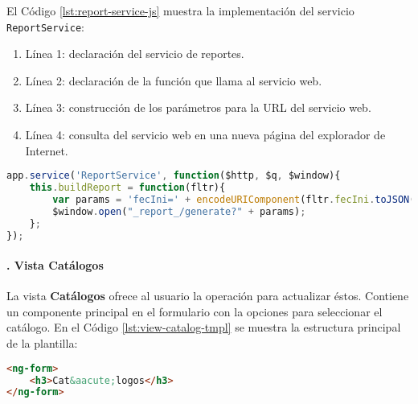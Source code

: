 El Código \ref{lst:report-service-js} muestra la implementación del servicio \texttt{ReportService}:
\begin{enumerate}
	\item Línea 1: declaración del servicio de reportes.
	\item Línea 2: declaración de la función que llama al servicio web.
	\item Línea 3: construcción de los parámetros para la URL del servicio web.
	\item Línea 4: consulta del servicio web en una nueva página del explorador de Internet.
\end{enumerate}
\begin{lstlisting}[language=Javascript, caption={Servicio en \textit{AngularJS} para pedir la generación de un reporte.}, captionpos=b, label={lst:report-service-js}]
app.service('ReportService', function($http, $q, $window){
	this.buildReport = function(fltr){
		var params = 'fecIni=' + encodeURIComponent(fltr.fecIni.toJSON()) + "&" + 'fecFin=' + encodeURIComponent(fltr.fecFin.toJSON()) + "&" + 'horIni=' + encodeURIComponent(fltr.horIni.toJSON()) + "&" + 'horFin=' + encodeURIComponent(fltr.horFin.toJSON()) + "&" + 'reporte=' + encodeURIComponent(fltr.reporte.key);
		$window.open("_report_/generate?" + params);
	};
});
\end{lstlisting}

\paragraph{. Vista Catálogos\\}
La vista \textbf{Catálogos} ofrece al usuario la operación para actualizar éstos. Contiene un componente principal en el formulario con la opciones para seleccionar el catálogo. En el Código \ref{lst:view-catalog-tmpl} se muestra la estructura principal de la plantilla:\\
\begin{lstlisting}[language=HTML, captionpos=b, caption={Plantilla de la vista que muestra los catálogos.}, label={lst:view-catalog-tmpl}]
<ng-form>
	<h3>Cat&aacute;logos</h3>
</ng-form>
\end{lstlisting}

\pagebreak

